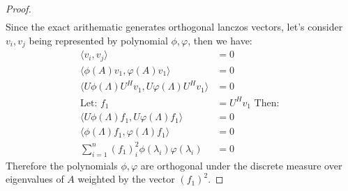 \documentclass[]{article}
\theoremstyle{definition}
\begin{document}
\begin{appendices}
\begin{proof}
\begin{align}
            \end{align}
            Since the exact arithematic generates orthogonal lanczos vectors, let's consider $v_i, v_j$ being represented by polynomial $\phi, \varphi$, then we have:
            \begin{align}
                \langle v_i, v_j\rangle &= 0 
                \\
                \langle\phi(A)v_1, \varphi(A)v_1 \rangle &= 0
                \\
                \langle U\phi(\Lambda)U^Hv_1, U\varphi(\Lambda)U^Hv_1\rangle &= 0
                \\
                \text{Let: }f_1 &= U^Hv_1 \text{ Then: }
                \\
                \langle U\phi(\Lambda)f_1, U\varphi(\Lambda)f_1\rangle &= 0
                \\
                \langle \phi(\Lambda)f_1, \varphi(\Lambda)f_1\rangle &= 0
                \\
                \sum_{i = 1}^{n} (f_1)_i^2\phi(\lambda_i)\varphi(\lambda_i) &= 0
            \end{align}
            Therefore the polynomials $\phi, \varphi$ are orthogonal under the discrete measure over eigenvalues of $A$ weighted by the vector $(f_1)^2$. 
        \end{proof}

\end{appendices}
\end{document}
